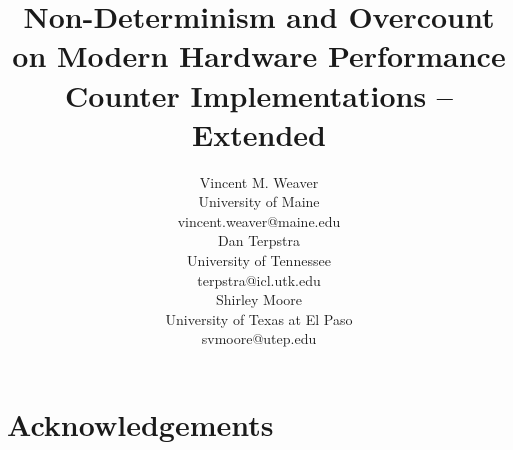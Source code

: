 \documentclass[10pt]{article}
\begin{document}
\title{Non-Determinism and Overcount on 
Modern Hardware Performance Counter Implementations -- Extended}

\author{Vincent M. Weaver\\
University of Maine\\
vincent.weaver@maine.edu\\[2ex]
Dan Terpstra\\
University of Tennessee\\
terpstra@icl.utk.edu\\[2ex]
Shirley Moore\\
University of Texas at El Paso\\
svmoore@utep.edu\\
}

\maketitle

\thispagestyle{firststyle}

\pagebreak

\begin{abstract}

\end{abstract}













\section*{Acknowledgements}




\end{document}
